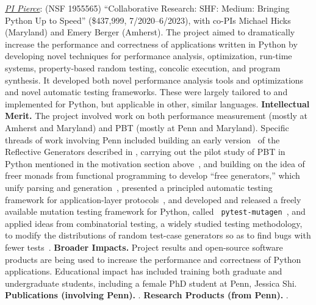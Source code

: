 
\emph{\underline{PI Pierce}}: (NSF 1955565) ``Collaborative Research:
SHF: Medium: Bringing Python Up to Speed'' (\$437,999,
7/2020--6/2023), with co-PIs Michael Hicks (Maryland) and Emery Berger
(Amherst).
The project aimed to dramatically increase the performance and
correctness of applications written in Python by developing novel
techniques for performance analysis, optimization, run-time systems,
property-based random testing, concolic execution, and program
synthesis. It developed both
novel performance analysis tools and optimizations and novel automatic
testing frameworks. These were largely tailored to and implemented for
Python, but applicable in other, similar languages.
%
{\bf Intellectual Merit.} The project involved work on both
performance measurement (mostly at Amherst and Maryland) and PBT (mostly at Penn
and Maryland).  Specific threads of work involving Penn included
building an early
version~\cite{Frohlich2022} of the Reflective Generators described in
, carrying out the pilot study of PBT in Python
mentioned in the motivation section
above~\cite{goldstein_problems_2022}, and building on the idea of
freer monads from functional programming to develop ``free
generators,'' which unify parsing and
generation~\cite{goldstein2022parsing}, presented a principled
automatic testing framework for application-layer
protocols~\cite{Li2021:MBToNA}, and developed and released a freely
available mutation testing framework for Python, called {\tt
  pytest-mutagen}~\cite{pytestmutagen}, and applied ideas from
combinatorial testing, a widely studied testing methodology, to modify
the distributions of random test-case generators so as to find bugs
with fewer tests~\cite{DBLP:conf/esop/GoldsteinHLP21}.
%
{\bf Broader Impacts.} Project results and open-source software
products are being used to increase the
performance and correctness of Python applications.
Educational impact has included training both graduate and
undergraduate students, including a female PhD student at Penn, Jessica
Shi.
%
{\bf Publications (involving Penn).} \cite{Frohlich2022,DBLP:conf/esop/GoldsteinHLP21,
  goldstein2022parsing, goldstein_problems_2022, Li2021:MBToNA}.
{\bf Research Products (from Penn).} \cite{pytestmutagen}.

